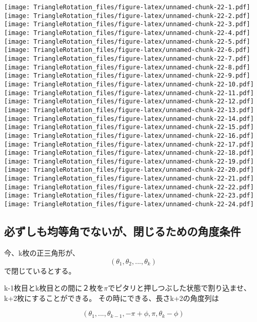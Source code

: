 \documentclass[]{article}
\begin{document}
\texttt{[image: TriangleRotation\_files/figure-latex/unnamed-chunk-22-1.pdf]}
\texttt{[image: TriangleRotation\_files/figure-latex/unnamed-chunk-22-2.pdf]}
\texttt{[image: TriangleRotation\_files/figure-latex/unnamed-chunk-22-3.pdf]}
\texttt{[image: TriangleRotation\_files/figure-latex/unnamed-chunk-22-4.pdf]}
\texttt{[image: TriangleRotation\_files/figure-latex/unnamed-chunk-22-5.pdf]}
\texttt{[image: TriangleRotation\_files/figure-latex/unnamed-chunk-22-6.pdf]}
\texttt{[image: TriangleRotation\_files/figure-latex/unnamed-chunk-22-7.pdf]}
\texttt{[image: TriangleRotation\_files/figure-latex/unnamed-chunk-22-8.pdf]}
\texttt{[image: TriangleRotation\_files/figure-latex/unnamed-chunk-22-9.pdf]}
\texttt{[image: TriangleRotation\_files/figure-latex/unnamed-chunk-22-10.pdf]}
\texttt{[image: TriangleRotation\_files/figure-latex/unnamed-chunk-22-11.pdf]}
\texttt{[image: TriangleRotation\_files/figure-latex/unnamed-chunk-22-12.pdf]}
\texttt{[image: TriangleRotation\_files/figure-latex/unnamed-chunk-22-13.pdf]}
\texttt{[image: TriangleRotation\_files/figure-latex/unnamed-chunk-22-14.pdf]}
\texttt{[image: TriangleRotation\_files/figure-latex/unnamed-chunk-22-15.pdf]}
\texttt{[image: TriangleRotation\_files/figure-latex/unnamed-chunk-22-16.pdf]}
\texttt{[image: TriangleRotation\_files/figure-latex/unnamed-chunk-22-17.pdf]}
\texttt{[image: TriangleRotation\_files/figure-latex/unnamed-chunk-22-18.pdf]}
\texttt{[image: TriangleRotation\_files/figure-latex/unnamed-chunk-22-19.pdf]}
\texttt{[image: TriangleRotation\_files/figure-latex/unnamed-chunk-22-20.pdf]}
\texttt{[image: TriangleRotation\_files/figure-latex/unnamed-chunk-22-21.pdf]}
\texttt{[image: TriangleRotation\_files/figure-latex/unnamed-chunk-22-22.pdf]}
\texttt{[image: TriangleRotation\_files/figure-latex/unnamed-chunk-22-23.pdf]}
\texttt{[image: TriangleRotation\_files/figure-latex/unnamed-chunk-22-24.pdf]}

\subsection{必ずしも均等角でないが、閉じるための角度条件}\label{ux5fc5ux305aux3057ux3082ux5747ux7b49ux89d2ux3067ux306aux3044ux304cux9589ux3058ux308bux305fux3081ux306eux89d2ux5ea6ux6761ux4ef6}

今、k枚の正三角形が、 \[
(\theta_1,\theta_2,...,\theta_k)
\] で閉じているとする。

k-1枚目とk枚目との間に２枚を\(\pi\)でピタリと押しつぶした状態で割り込ませ、k+2枚にすることができる。
その時にできる、長さk+2の角度列は

\[
(\theta_1,...,\theta_{k-1},-\pi + \phi, \pi, \theta_k - \phi)
\]
\end{document}
